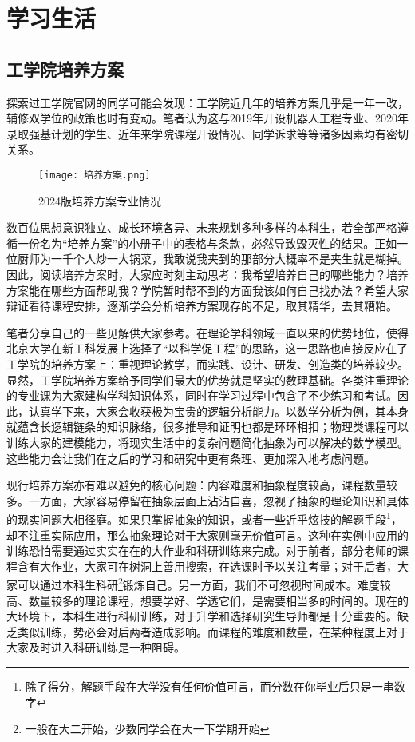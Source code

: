 \documentclass[11pt,oneside]{book}
\begin{document}
\chapter{学习生活}
\section{工学院培养方案}
探索过工学院官网的同学可能会发现：工学院近几年的培养方案几乎是一年一改，辅修双学位的政策也时有变动。笔者认为这与2019年开设机器人工程专业、2020年录取强基计划的学生、近年来学院课程开设情况、同学诉求等等诸多因素均有密切关系。



\begin{figure}[htbp]
  \centering
	\texttt{[image: 培养方案.png]}
	\renewcommand{\figurename}{图}
	\caption{2024版培养方案专业情况}
	\label{fig:enter-label}
\end{figure}


\vspace{10pt}

数百位思想意识独立、成长环境各异、未来规划多种多样的本科生，若全部严格遵循一份名为“培养方案”的小册子中的表格与条款，必然导致毁灭性的结果。正如一位厨师为一千个人炒一大锅菜，我敢说我夹到的那部分大概率不是夹生就是糊掉。因此，阅读培养方案时，大家应时刻主动思考：我希望培养自己的哪些能力？培养方案能在哪些方面帮助我？学院暂时帮不到的方面我该如何自己找办法？希望大家辩证看待课程安排，逐渐学会分析培养方案现存的不足，取其精华，去其糟粕。

\vspace{10pt}

笔者分享自己的一些见解供大家参考。在理论学科领域一直以来的优势地位，使得北京大学在新工科发展上选择了“以科学促工程”的思路，这一思路也直接反应在了工学院的培养方案上：重视理论教学，而实践、设计、研发、创造类的培养较少。显然，工学院培养方案给予同学们最大的优势就是坚实的数理基础。各类注重理论的专业课为大家建构学科知识体系，同时在学习过程中包含了不少练习和考试。因此，认真学下来，大家会收获极为宝贵的逻辑分析能力。以数学分析为例，其本身就蕴含长逻辑链条的知识脉络，很多推导和证明也都是环环相扣；物理类课程可以训练大家的建模能力，将现实生活中的复杂问题简化抽象为可以解决的数学模型。这些能力会让我们在之后的学习和研究中更有条理、更加深入地考虑问题。

\vspace{10pt}

现行培养方案亦有难以避免的核心问题：内容难度和抽象程度较高，课程数量较多。一方面，大家容易停留在抽象层面上沾沾自喜，忽视了抽象的理论知识和具体的现实问题大相径庭。如果只掌握抽象的知识，或者一些近乎炫技的解题手段\footnote{除了得分，解题手段在大学没有任何价值可言，而分数在你毕业后只是一串数字}，却不注重实际应用，那么抽象理论对于大家则毫无价值可言。这种在实例中应用的训练恐怕需要通过实实在在的大作业和科研训练来完成。对于前者，部分老师的课程含有大作业，大家可在树洞上善用搜索，在选课时予以关注考量；对于后者，大家可以通过本科生科研\footnote{一般在大二开始，少数同学会在大一下学期开始}锻炼自己。另一方面，我们不可忽视时间成本。难度较高、数量较多的理论课程，想要学好、学透它们，是需要相当多的时间的。现在的大环境下，本科生进行科研训练，对于升学和选择研究生导师都是十分重要的。缺乏类似训练，势必会对后两者造成影响。而课程的难度和数量，在某种程度上对于大家及时进入科研训练是一种阻碍。
\end{document}
